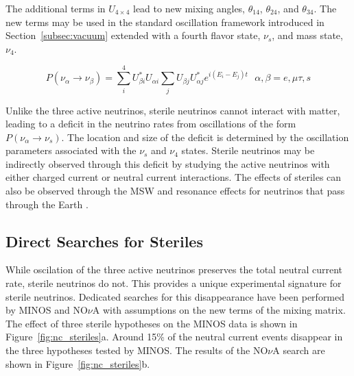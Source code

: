 The additional terms in $U_{4\times 4}$ lead to new mixing angles, $\theta_{14}$, $\theta_{24}$, and $\theta_{34}$.
The new terms may be used in the standard oscillation framework introduced in Section~\ref{subsec:vacuum} extended with a fourth flavor state, ${\nu_s}$, and mass state, ${\nu_4}$.

\begin{equation}
P\left(\nu_\alpha\rightarrow\nu_\beta\right) =  \sum_i^{4} U^*_{\beta i} U_{\alpha i} \sum_j U_{\beta j} U^*_{\alpha j} e^{i \left(E_i-E_j\right) t} \ \ \ \alpha,\beta = e,\mu\tau,s
\label{eqn:sterile_pmns_probability_expanded}
\end{equation}

Unlike the three active neutrinos, sterile neutrinos cannot interact with matter, leading to a deficit in the neutrino rates from oscillations of the form ${P\left(\nu_\alpha\rightarrow\nu_s\right)}$.
The location and size of the deficit is determined by the oscillation parameters associated with the ${\nu_s}$ and ${\nu_4}$ states.
Sterile neutrinos may be indirectly observed through this deficit by studying the active neutrinos with either charged current or neutral current interactions.
The effects of steriles can also be observed through the MSW and resonance effects for neutrinos that pass through the Earth \cite{IceCubeSterile-IC86-1}.

\subsection{Direct Searches for Steriles}
While oscilation of the three active neutrinos preserves the total neutral current rate, sterile neutrinos do not.
This provides a unique experimental signature for sterile neutrinos.
Dedicated searches for this disappearance have been performed by MINOS \cite{MINOS-SterileNC-2011,MINOS-SterileNC-2016} and NO${\nu}$A \cite{NOvA-SterileNC} with assumptions on the new terms of the mixing matrix.
The effect of three sterile hypotheses on the MINOS data is shown in Figure~\ref{fig:nc_steriles}a. 
Around 15\% of the neutral current events disappear in the three hypotheses tested by MINOS.
The results of the NO${\nu}$A search are shown in Figure~\ref{fig:nc_steriles}b.


